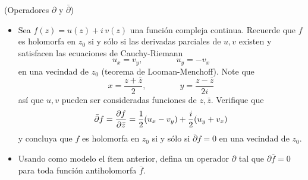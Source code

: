 \begin{exercise}
(Operadores $\partial$ y $\bar \partial$)

\begin{itemize}
    \item Sea $f(z) = u(z) + i \, v(z)$ una función compleja continua. Recuerde que $f$ es holomorfa en $z_0$ si y sólo si las derivadas parciales de $u, v$ existen y satisfacen las ecuaciones de Cauchy-Riemann
    $$u_x = v_y, \qquad \qquad u_y = -v_x$$
    en una vecindad de $z_0$ (teorema de Looman-Menchoff). Note que
    $$x = \frac {z + \bar z} 2, \qquad \qquad y = \frac {z - \bar z} {2i}$$
    así que $u, v$ pueden ser consideradas funciones de $z, \bar z$. Verifique que
    $$\bar \partial f = \frac {\partial f} {\partial \bar z} = \frac 12 (u_x - v_y) + \frac i2 (u_y + v_x)$$
    y concluya que $f$ es holomorfa en $z_0$ si y sólo si $\bar \partial f = 0$ en una vecindad de $z_0$.
    
    \item Usando como modelo el ítem anterior, defina un operador $\partial$ tal que $\partial \bar f = 0$ para toda función antiholomorfa $\bar f$.
\end{itemize}
\end{exercise}

